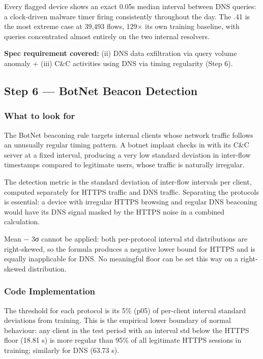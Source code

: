 \documentclass[
  11pt,
]{article}
\begin{document}
Every flagged device shows an exact 0.05s median interval between DNS
queries: a clock-driven malware timer firing consistently throughout the
day. The .41 is the most extreme case at 39,493 flows, 129× its own
training baseline, with queries concentrated almost entirely on the two
internal resolvers.

\medskip
\noindent\colorbox{gray!12}{\parbox{\dimexpr\linewidth-2\fboxsep\relax}{\textbf{Spec requirement covered:} (ii) DNS data exfiltration via query volume anomaly + (iii) C\&C activities using DNS via timing regularity (Step 6).}}

\hypertarget{botnet-beacon-detection}{%
\subsection{Step 6 — BotNet Beacon Detection}\label{botnet-beacon-detection}}

\hypertarget{what-to-look-for-7}{%
\subsubsection{What to look for}\label{what-to-look-for-7}}

The BotNet beaconing rule targets internal clients whose network traffic
follows an unusually regular timing pattern. A botnet implant checks in
with its C\&C server at a fixed interval, producing a very low standard
deviation in inter-flow timestamps compared to legitimate users, whose
traffic is naturally irregular.

The detection metric is the standard deviation of inter-flow intervals
per client, computed separately for HTTPS traffic and DNS traffic.
Separating the protocols is essential: a device with irregular HTTPS
browsing and regular DNS beaconing would have its DNS signal masked by
the HTTPS noise in a combined calculation.

Mean − 3σ cannot be applied: both per-protocol interval std distributions are right-skewed, so the formula produces a negative lower bound for HTTPS and is equally inapplicable for DNS. No meaningful floor can be set this way on a right-skewed distribution.

\subsubsection{Code Implementation}

The threshold for each protocol is its 5\% (p05) of per-client interval standard deviations from training. This is the empirical lower boundary of normal behaviour: any client in the test period with an interval std below the HTTPS floor (18.81 s) is more regular than 95\% of all legitimate HTTPS sessions in training; similarly for DNS (63.73 s).
\end{document}
